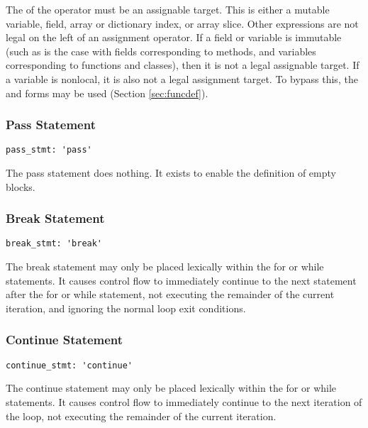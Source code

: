 The  of the operator must be an assignable target. This is either a
mutable variable, field, array or dictionary index, or array slice. Other
expressions are not legal on the left of an assignment operator. If a field or
variable is immutable (such as is the case with fields corresponding to methods,
and variables corresponding to functions and classes), then it is not a legal
assignable target. If a variable is nonlocal, it is also not a legal assignment
target. To bypass this, the  and  forms may be used
(Section \ref{sec:funcdef}).

\subsubsection{Pass Statement}

\begin{lstlisting}
pass_stmt: 'pass'
\end{lstlisting}

The pass statement does nothing. It exists to enable the definition of empty
blocks.

\subsubsection{Break Statement}
\label{sec:break_stmt}

\begin{lstlisting}
break_stmt: 'break'
\end{lstlisting}

The break statement may only be placed lexically within the for or while
statements. It causes control flow to immediately continue to the next statement
after the for or while statement, not executing the remainder of the current
iteration, and ignoring the normal loop exit conditions.

\subsubsection{Continue Statement}
\label{sec:continue_stmt}

\begin{lstlisting}
continue_stmt: 'continue'
\end{lstlisting}

The continue statement may only be placed lexically within the for or while
statements. It causes control flow to immediately continue to the next iteration
of the loop, not executing the remainder of the current iteration.


